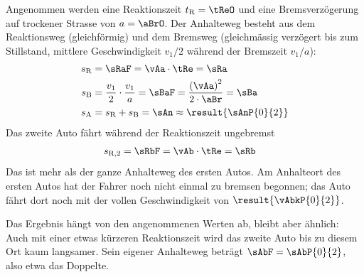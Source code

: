 Angenommen werden eine Reaktionszeit $t_\mathrm{R} = \tReO$ und eine Bremsverzögerung auf trockener Strasse von $a = \aBrO$. Der Anhalteweg besteht aus dem Reaktionsweg (gleichförmig) und dem Bremsweg (gleichmässig verzögert bis zum Stillstand, mittlere Geschwindigkeit $v_1/2$ während der Bremszeit $v_1/a$):
\begin{align}
 s_\mathrm{R} &= \sRaF = \vAa\cdot\tRe = \sRa \\
 s_\mathrm{B} &= \frac{v_1}{2}\cdot\frac{v_1}{a} = \sBaF = \frac{\left(\vAa\right)^2}{2\cdot\aBr} = \sBa \\
 s_\mathrm{A} &= s_\mathrm{R}+s_\mathrm{B} = \sAn \approx \result{\sAnP{0}{2}}
\end{align}
Das zweite Auto fährt während der Reaktionszeit ungebremst
\begin{align}
 s_\mathrm{R,2} &= \sRbF = \vAb\cdot\tRe = \sRb
\end{align}
Das ist mehr als der ganze Anhalteweg des ersten Autos. Am Anhalteort des ersten Autos hat der Fahrer noch nicht einmal zu bremsen begonnen; das Auto fährt dort noch mit der vollen Geschwindigkeit von $\result{\vAbkP{0}{2}}$.

Das Ergebnis hängt von den angenommenen Werten ab, bleibt aber ähnlich: Auch mit einer etwas kürzeren Reaktionszeit wird das zweite Auto bis zu diesem Ort kaum langsamer. Sein eigener Anhalteweg beträgt $\sAbF = \sAbP{0}{2}$, also etwa das Doppelte.
